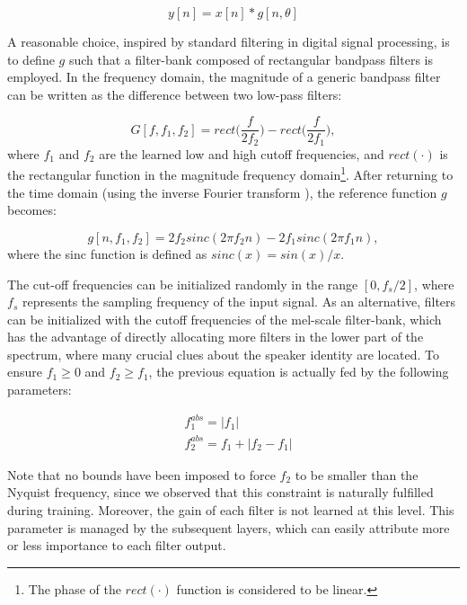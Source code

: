 \documentclass{article}
\begin{document}
\begin{equation}
y[n]=x[n]*g[n,\theta] 
\end{equation}

A reasonable choice, inspired by standard filtering in digital signal processing, is to define $g$ such that a filter-bank composed of rectangular bandpass filters is employed. In the frequency domain, the magnitude of a generic bandpass filter can be written as the difference between two low-pass filters:

\begin{equation}
G[f,f_1,f_2]= rect\Big(\frac{f}{2f_{2}}\Big) - rect\Big(\frac{f}{2f_{1}}\Big),
\end{equation}
where $f_{1}$ and $f_{2}$ are the learned low and high cutoff frequencies, and $rect(\cdot)$ is the rectangular function in the magnitude frequency domain\footnote{The phase of the $rect(\cdot)$ function is considered to be linear.}.
After returning to the time domain (using the inverse Fourier transform \cite{rabiner11}), the reference function $g$ becomes:

\begin{equation}
g[n,f_1,f_2]= 2f_{2}sinc(2\pi f_2n) - 2f_{1}sinc(2\pi f_1n),
\end{equation}
where the sinc function is defined as $sinc(x)=sin(x)/x$. 

The cut-off frequencies can be initialized randomly in the range $[0,f_s/2]$, where $f_s$ represents the sampling frequency of the input signal.  
As an alternative, filters can be initialized with the cutoff frequencies of the mel-scale filter-bank, which has the advantage  of directly allocating more filters in the lower part of the spectrum, where many crucial clues about the speaker identity are located.
To ensure $f_1\geq0$ and $f_2 \geq f_1$, the previous equation is actually fed by the following parameters:

\begin{align} 
&f_1^{abs}=|f_1| \\ 
&f_2^{abs}=f_1+|f_2-f_1|
\end{align}

Note that no bounds have been imposed to force $f_2$ to be smaller than the Nyquist frequency, since we observed that this constraint is naturally fulfilled during training. 
Moreover, the gain of each filter is not learned at this level. This parameter is managed by the subsequent layers, which can easily attribute more or less importance to each filter output. 
\end{document}
